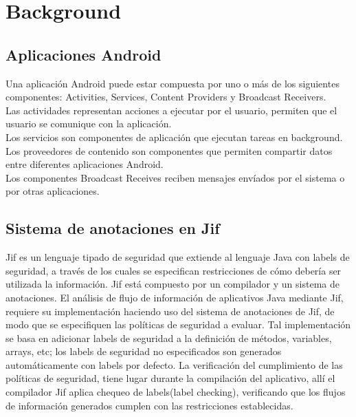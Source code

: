 \section{Background}
\label{sec:back}

\subsection{Aplicaciones Android}
Una aplicación Android puede estar compuesta por uno o más de los siguientes
componentes: Activities, Services, Content Providers y Broadcast Receivers.\\
Las actividades representan acciones a ejecutar por el usuario, permiten que el
usuario se comunique con la aplicación.\\
Los servicios son componentes de aplicación que ejecutan tareas en background.\\
Los proveedores de contenido son componentes que permiten compartir datos entre
diferentes aplicaciones Android.\\
Los componentes Broadcast Receives reciben mensajes envíados por el sistema o
por otras aplicaciones.

\subsection{Sistema de anotaciones en Jif}
Jif es un lenguaje tipado de seguridad que extiende al lenguaje Java con labels
de seguridad, a través de los cuales se especifican restricciones de cómo
debería ser utilizada la información. Jif está compuesto por un compilador y un
sistema de anotaciones.\newline
El análisis de flujo de información de aplicativos Java mediante Jif, requiere
su implementación haciendo uso del sistema de anotaciones de Jif, de modo que se
especifiquen las políticas de seguridad a evaluar.
Tal implementación se basa en adicionar labels de seguridad a la definición
de métodos, variables, arrays, etc; los labels de seguridad no especificados son
generados automáticamente con labels por defecto.\newline
La verificación del cumplimiento de las políticas de seguridad, tiene lugar
durante la compilación del aplicativo, allí el compilador Jif aplica chequeo de
labels(label checking)\cite{jifRef},  verificando que los flujos de información
generados cumplen con las restricciones establecidas. 

